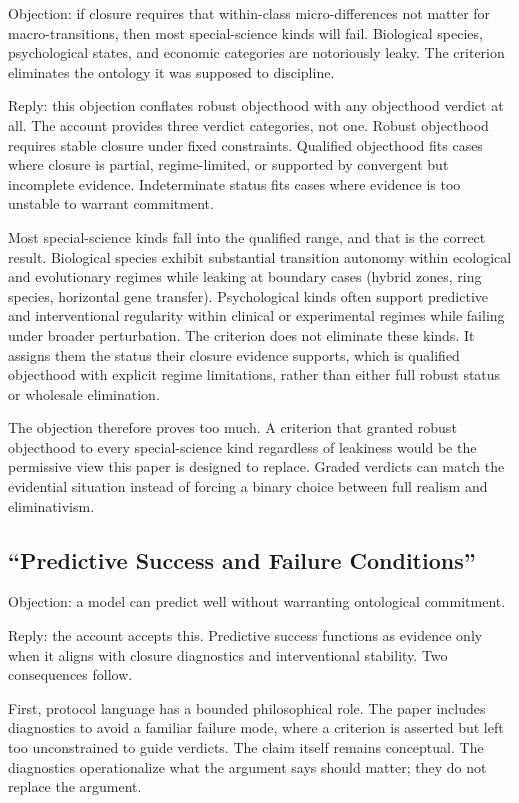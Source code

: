 Objection: if closure requires that within-class micro-differences not
matter for macro-transitions, then most special-science kinds will fail.
Biological species, psychological states, and economic categories are
notoriously leaky. The criterion eliminates the ontology it was supposed
to discipline.

Reply: this objection conflates robust objecthood with any objecthood
verdict at all. The account provides three verdict categories, not
one. Robust objecthood requires stable closure under fixed constraints.
Qualified objecthood fits cases where closure is partial,
regime-limited, or supported by convergent but incomplete evidence.
Indeterminate status fits cases where evidence is too unstable to
warrant commitment.

Most special-science kinds fall into the qualified range, and that is
the correct result. Biological species exhibit substantial transition
autonomy within ecological and evolutionary regimes while leaking at
boundary cases (hybrid zones, ring species, horizontal gene transfer).
Psychological kinds often support predictive and interventional
regularity within clinical or experimental regimes while failing under
broader perturbation. The criterion does not eliminate these kinds. It
assigns them the status their closure evidence supports, which is
qualified objecthood with explicit regime limitations, rather than either full robust status or wholesale elimination.

The objection therefore proves too much. A criterion that granted robust
objecthood to every special-science kind regardless of leakiness would
be the permissive view this paper is designed to replace. Graded
verdicts can match the evidential situation instead of forcing a binary
choice between full realism and eliminativism.

\subsection{``Predictive Success and Failure
	Conditions''}\label{predictive-success-and-failure-conditions}

Objection: a model can predict well without warranting ontological
commitment.

Reply: the account accepts this. Predictive success functions as
evidence only when it aligns with closure diagnostics and
interventional stability. Two consequences follow.

First, protocol language has a bounded philosophical role. The paper
includes diagnostics to avoid a familiar failure mode, where a criterion
is asserted but left too unconstrained to guide verdicts. The claim
itself remains conceptual. The diagnostics operationalize what the
argument says should matter; they do not replace the argument.


